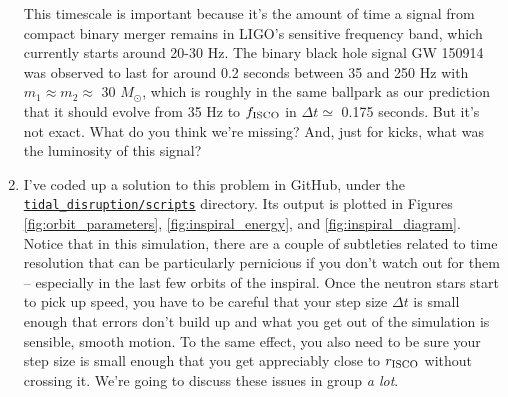 \documentclass[11pt]{article}
\begin{document}
\begin{enumerate}
\hspace{15pt} This timescale is important because it's the amount of time a signal from compact binary merger remains in LIGO's sensitive frequency band, which currently starts around 20-30 Hz. The binary black hole signal GW 150914 was observed to last for around 0.2 seconds between 35 and 250 Hz with $m_1 \approx m_2 \approx$ 30 $M_{\odot}$, which is roughly in the same ballpark as our prediction that it should evolve from 35 Hz to $f_{\rm ISCO}$ in $\Delta t \simeq$ 0.175 seconds. But it's not exact. What do you think we're missing? And, just for kicks, what was the luminosity of this signal?

\item I've coded up a solution to this problem in GitHub, under the \href{https://github.com/alurban/mentoring/blob/master/tidal_disruption/scripts/decaying_orbit.py}{\texttt{tidal\_disruption/scripts}} directory. Its output is plotted in Figures \ref{fig:orbit_parameters}, \ref{fig:inspiral_energy}, and \ref{fig:inspiral_diagram}. Notice that in this simulation, there are a couple of subtleties related to time resolution that can be particularly pernicious if you don't watch out for them -- especially in the last few orbits of the inspiral. Once the neutron stars start to pick up speed, you have to be careful that your step size $\Delta t$ is small enough that errors don't build up and what you get out of the simulation is sensible, smooth motion. To the same effect, you also need to be sure your step size is small enough that you get appreciably close to $r_{\rm ISCO}$ without crossing it. We're going to discuss these issues in group \emph{a lot}.


\end{enumerate}
\end{document}
